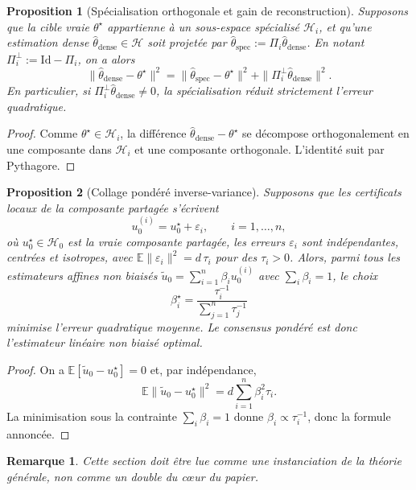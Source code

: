 \documentclass[11pt,a4paper]{article}
\newtheorem{proposition}{Proposition}[section]
\newtheorem{remark}{Remarque}[section]
\newcommand{\Hh}{\mathcal H}
\begin{document}
\begin{proposition}[Spécialisation orthogonale et gain de reconstruction]
Supposons que la cible vraie \(\theta^\star\) appartienne à un sous-espace spécialisé \(\Hh_i\), et qu'une estimation dense \(\hat\theta_{\mathrm{dense}}\in\Hh\) soit projetée par \(\hat\theta_{\mathrm{spec}}:=\Pi_i\hat\theta_{\mathrm{dense}}\). En notant \(\Pi_i^\perp:=\mathrm{Id}-\Pi_i\), on a alors
\[
\|\hat\theta_{\mathrm{dense}}-\theta^\star\|^2
=
\|\hat\theta_{\mathrm{spec}}-\theta^\star\|^2
+
\|\Pi_i^\perp \hat\theta_{\mathrm{dense}}\|^2.
\]
En particulier, si \(\Pi_i^\perp \hat\theta_{\mathrm{dense}}\neq 0\), la spécialisation réduit strictement l'erreur quadratique.
\end{proposition}

\begin{proof}
Comme \(\theta^\star\in\Hh_i\), la différence \(\hat\theta_{\mathrm{dense}}-\theta^\star\) se décompose orthogonalement en une composante dans \(\Hh_i\) et une composante orthogonale. L'identité suit par Pythagore.
\end{proof}

\begin{proposition}[Collage pondéré inverse-variance]
Supposons que les certificats locaux de la composante partagée s'écrivent
\[
u_0^{(i)} = u_0^\star + \varepsilon_i,\qquad i=1,\dots,n,
\]
où \(u_0^\star\in\Hh_0\) est la vraie composante partagée, les erreurs \(\varepsilon_i\) sont indépendantes, centrées et isotropes, avec \(\mathbb E\|\varepsilon_i\|^2 = d\,\tau_i\) pour des \(\tau_i>0\). Alors, parmi tous les estimateurs affines non biaisés \(\tilde u_0=\sum_{i=1}^n \beta_i u_0^{(i)}\) avec \(\sum_i\beta_i=1\), le choix
\[
\beta_i^\star=\frac{\tau_i^{-1}}{\sum_{j=1}^n \tau_j^{-1}}
\]
minimise l'erreur quadratique moyenne. Le consensus pondéré est donc l'estimateur linéaire non biaisé optimal.
\end{proposition}

\begin{proof}
On a \(\mathbb E[\tilde u_0-u_0^\star]=0\) et, par indépendance,
\[
\mathbb E\|\tilde u_0-u_0^\star\|^2
=
 d\sum_{i=1}^n \beta_i^2 \tau_i.
\]
La minimisation sous la contrainte \(\sum_i\beta_i=1\) donne \(\beta_i\propto \tau_i^{-1}\), donc la formule annoncée.
\end{proof}

\begin{remark}
Cette section doit être lue comme une instanciation de la théorie générale, non comme un double du cœur du papier.
\end{remark}
\end{document}
